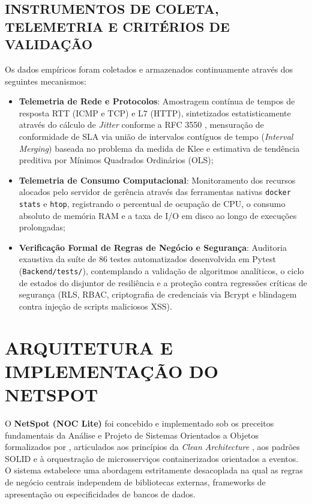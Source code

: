 \documentclass[12pt,a4paper]{article}
\begin{document}
\subsection{INSTRUMENTOS DE COLETA, TELEMETRIA E CRITÉRIOS DE VALIDAÇÃO}
Os dados empíricos foram coletados e armazenados continuamente através dos seguintes mecanismos:
\begin{itemize}[leftmargin=1.25cm]
\item \textbf{Telemetria de Rede e Protocolos}: Amostragem contínua de tempos de resposta RTT (ICMP e TCP) e L7 (HTTP), sintetizados estatisticamente através do cálculo de \textit{Jitter} conforme a RFC 3550 \cite{schulzrinne2003rfc3550}, mensuração de conformidade de SLA via união de intervalos contíguos de tempo (\textit{Interval Merging}) baseada no problema da medida de Klee \cite{bentley1977klee} e estimativa de tendência preditiva por Mínimos Quadrados Ordinários (OLS);
\item \textbf{Telemetria de Consumo Computacional}: Monitoramento dos recursos alocados pelo servidor de gerência através das ferramentas nativas \texttt{docker stats} e \texttt{htop}, registrando o percentual de ocupação de CPU, o consumo absoluto de memória RAM e a taxa de I/O em disco ao longo de execuções prolongadas;
\item \textbf{Verificação Formal de Regras de Negócio e Segurança}: Auditoria exaustiva da suíte de 86 testes automatizados desenvolvida em Pytest (\texttt{Backend/tests/}), contemplando a validação de algoritmos analíticos, o ciclo de estados do disjuntor de resiliência e a proteção contra regressões críticas de segurança (RLS, RBAC, criptografia de credenciais via Bcrypt \cite{provos1999bcrypt} e blindagem contra injeção de scripts maliciosos XSS).
\end{itemize}

\section{ARQUITETURA E IMPLEMENTAÇÃO DO NETSPOT}
O \textbf{NetSpot (NOC Lite)} foi concebido e implementado sob os preceitos fundamentais da Análise e Projeto de Sistemas Orientados a Objetos formalizados por , articulados aos princípios da \textit{Clean Architecture} \cite{engsoftmoderna}, aos padrões SOLID e à orquestração de microsserviços containerizados orientados a eventos. O sistema estabelece uma abordagem estritamente desacoplada na qual as regras de negócio centrais independem de bibliotecas externas, frameworks de apresentação ou especificidades de bancos de dados.
\end{document}
